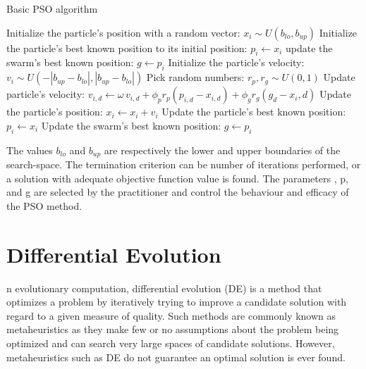 \documentclass[11pt, a4paper]{report}
\begin{document}
\newpage

\begin{algorithm}
	\caption{Basic PSO algorithm}\label{algo:pso}
	\begin{algorithmic}[1]
		\State Initialize the particle's position with a random vector: $ x_{i} \sim U(b_{lo}, b_{up}) $
		\State Initialize the particle's best known position to its initial position: $ p_{i} \gets x_{i} $
		\State update the swarm's best known  position: $ g \gets p_{i} $
		\EndIf
		\State Initialize the particle's velocity: $ v_{i} \sim  U(-|b_{up}-b_{lo}|, |b_{up}-b_{lo}|) $
		\State Pick random numbers: $ r_{p}, r_{g} \sim U(0,1) $
		\State          Update particle's velocity: $ v_{i,d} \gets \omega\, v_{i,d} + \phi_{p} r_{p} (p_{i,d}-x_{i,d}) + \phi_{g} r_{g} (g_{d}-x_{i},d) $
		\State Update the particle's position: $ x_{i} \gets x_{i} + v_{i} $
		\State Update the particle's best known position: $ p_{i} ← x_{i} $
		\State Update the swarm's best known position: $ g \gets p_{i} $
		\EndIf
		\EndIf
		\EndFor
		\EndFor
		\EndWhile
		\EndFor
	\end{algorithmic}
\end{algorithm}

The values $ b_{lo} $ and $ b_{up} $ are respectively the lower and upper boundaries of the search-space. The termination criterion can be number of iterations performed, or a solution with adequate objective function value is found. The parameters \omega, \phi p, and \phi g are selected by the practitioner and control the behaviour and efficacy of the PSO method. \cite{wiki:pso}
\newpage


\section{Differential Evolution}
n evolutionary computation, differential evolution (DE) is a method that optimizes a problem by iteratively trying to improve a candidate solution with regard to a given measure of quality. Such methods are commonly known as metaheuristics as they make few or no assumptions about the problem being optimized and can search very large spaces of candidate solutions. However, metaheuristics such as DE do not guarantee an optimal solution is ever found. \\
\end{document}
